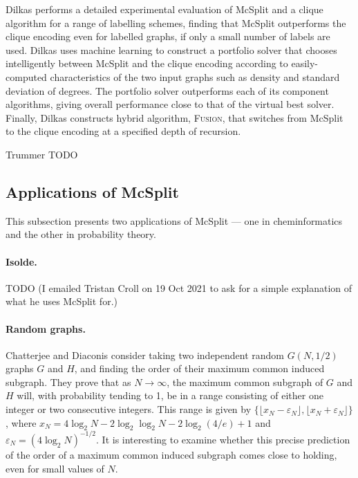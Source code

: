 Dilkas \cite{dilkas2018} performs a detailed experimental evaluation
of McSplit and a clique algorithm for a range of labelling schemes, finding that McSplit
outperforms the clique encoding even for labelled graphs, if only a small number of labels are
used.  Dilkas uses machine learning to construct a portfolio solver that chooses intelligently
between McSplit and the clique encoding according to easily-computed characteristics of the
two input graphs such as density and standard deviation of degrees. The portfolio solver
outperforms each of its component algorithms, giving overall performance close to that of the virtual
best solver.  Finally, Dilkas constructs hybrid algorithm, \textsc{Fusion}, that switches
from McSplit to the clique encoding at a specified depth of recursion.

Trummer \cite{trummer2021} TODO

\subsection{Applications of McSplit}

This subsection presents two applications of McSplit --- one in cheminformatics
and the other in probability theory.

\paragraph{Isolde.} TODO (I emailed Tristan Croll on 19 Oct 2021 to ask for a simple explanation of
what he uses McSplit for.)

\paragraph{Random graphs.} Chatterjee and Diaconis \cite{chatterjee2021isomorphisms} consider taking two
independent random $G(N, 1/2)$ graphs $G$ and $H$, and finding the order of their maximum
common induced subgraph.  They prove that as $N\to\infty$, the maximum common
subgraph of $G$ and $H$ will, with probability tending to 1, be in a range
consisting of either one integer or two consecutive integers.  This range
is given by $\{\lfloor x_N - \varepsilon_N\rfloor, \lfloor x_N + \varepsilon_N\rfloor\}$,
where $x_N = 4 \log_2 N - 2 \log_2\log_2 N - 2 \log_2(4/e) + 1$
and $\varepsilon_N = (4 \log_2 N)^{-1/2}$.  It is interesting to examine whether
this precise prediction of the order of a maximum common induced subgraph
comes close to holding, even for small values of $N$.

